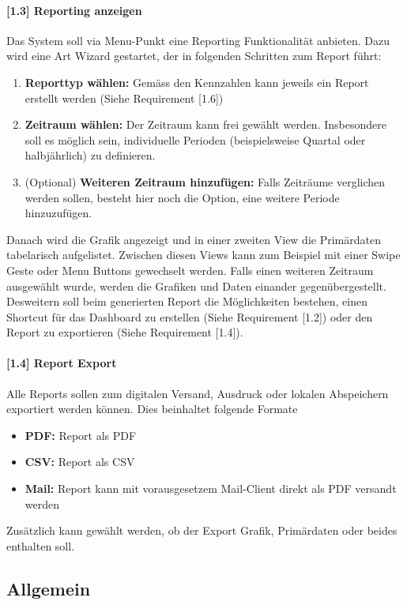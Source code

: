 \documentclass[a4paper]{scrreprt}
\begin{document}
\paragraph{[1.3] Reporting anzeigen}
Das System soll via Menu-Punkt eine Reporting Funktionalität anbieten. Dazu wird eine Art Wizard gestartet, der in folgenden Schritten zum Report führt:
\begin{enumerate}
\item \textbf{Reporttyp wählen:} Gemäss den Kennzahlen kann jeweils ein Report erstellt werden (Siehe Requirement [1.6])
\item \textbf{Zeitraum wählen:} Der Zeitraum kann frei gewählt werden. Insbesondere soll es möglich sein, individuelle Perioden (beispielsweise Quartal oder halbjährlich) zu definieren.
\item (Optional) \textbf{Weiteren Zeitraum hinzufügen:} Falls Zeiträume verglichen werden sollen, besteht hier noch die Option, eine weitere Periode hinzuzufügen.
\end{enumerate}
Danach wird die Grafik angezeigt und in einer zweiten View die Primärdaten tabelarisch aufgelistet. Zwischen diesen Views kann zum Beispiel mit einer Swipe Geste oder Menu Buttons gewechselt werden. Falls einen weiteren Zeitraum ausgewählt wurde, werden die Grafiken und Daten einander gegenübergestellt.\\
Desweitern soll beim generierten Report die Möglichkeiten bestehen, einen Shortcut für das Dashboard zu erstellen (Siehe Requirement [1.2]) oder den Report zu exportieren (Siehe Requirement [1.4]).

\pagebreak

\paragraph{[1.4] Report Export}
Alle Reports sollen zum digitalen Versand, Ausdruck oder lokalen Abspeichern exportiert werden können. Dies beinhaltet folgende Formate
\begin{itemize}
\item \textbf{PDF:} Report als PDF
\item \textbf{CSV:} Report als CSV
\item \textbf{Mail:} Report kann mit vorausgesetzem Mail-Client direkt als PDF versandt werden
\end{itemize}
Zusätzlich kann gewählt werden, ob der Export Grafik, Primärdaten oder beides enthalten soll.

\subsection{Allgemein}
\end{document}
